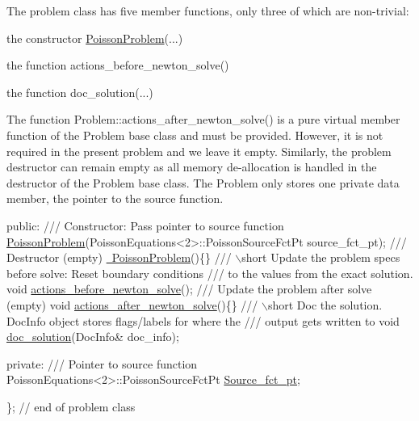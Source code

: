The problem class has five member functions, only three of which are non-\/trivial\+:
\begin{DoxyItemize}
\item the constructor {\ttfamily \hyperlink{classPoissonProblem}{Poisson\+Problem}}(...)
\item the function {\ttfamily actions\+\_\+before\+\_\+newton\+\_\+solve()} 
\item the function {\ttfamily doc\+\_\+solution}(...)
\end{DoxyItemize}The function {\ttfamily Problem\+::actions\+\_\+after\+\_\+newton\+\_\+solve()} is a pure virtual member function of the {\ttfamily Problem} base class and must be provided. However, it is not required in the present problem and we leave it empty. Similarly, the problem destructor can remain empty as all memory de-\/allocation is handled in the destructor of the {\ttfamily Problem} base class. The Problem only stores one private data member, the pointer to the source function.


\begin{DoxyCodeInclude}
\textcolor{keyword}{public}:
\textcolor{comment}{}
\textcolor{comment}{ /// Constructor: Pass pointer to source function}
\textcolor{comment}{} \hyperlink{classPoissonProblem_a9c28346c473d246d8f61022365e742ea}{PoissonProblem}(PoissonEquations<2>::PoissonSourceFctPt source\_fct\_pt);
\textcolor{comment}{}
\textcolor{comment}{ /// Destructor (empty)}
\textcolor{comment}{} \hyperlink{classPoissonProblem_ac247e42d2d292200617f4b9db7ed1ab8}{~PoissonProblem}()\{\}
\textcolor{comment}{}
\textcolor{comment}{ /// \(\backslash\)short Update the problem specs before solve: Reset boundary conditions}
\textcolor{comment}{ /// to the values from the exact solution.}
\textcolor{comment}{} \textcolor{keywordtype}{void} \hyperlink{classPoissonProblem_a398608a5ff73b74c5a387b3f794c58df}{actions\_before\_newton\_solve}();
\textcolor{comment}{}
\textcolor{comment}{ /// Update the problem after solve (empty)}
\textcolor{comment}{} \textcolor{keywordtype}{void} \hyperlink{classPoissonProblem_a7a9478d8e1e5c7d3a886b00ab7d50bbd}{actions\_after\_newton\_solve}()\{\}
\textcolor{comment}{}
\textcolor{comment}{ /// \(\backslash\)short Doc the solution. DocInfo object stores flags/labels for where the}
\textcolor{comment}{ /// output gets written to}
\textcolor{comment}{} \textcolor{keywordtype}{void} \hyperlink{classPoissonProblem_aab6f503fa242f687bb8452527bb7688f}{doc\_solution}(DocInfo& doc\_info);

\textcolor{keyword}{private}:
\textcolor{comment}{}
\textcolor{comment}{ /// Pointer to source function}
\textcolor{comment}{} PoissonEquations<2>::PoissonSourceFctPt \hyperlink{classPoissonProblem_a2ba5bb705abab012b72bbd7f4016d5fe}{Source\_fct\_pt};

\}; \textcolor{comment}{// end of problem class}

\end{DoxyCodeInclude}



